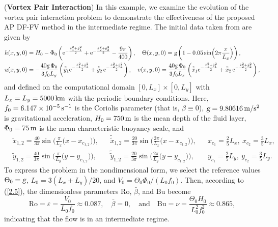 \documentclass[a4paper,11pt,twoside]{article}
\numberwithin{equation}{section}
\numberwithin{figure}{section}
\numberwithin{table}{section}
\newcommand{\eps}{\varepsilon}
\newcommand{\g}{\textsl{g}}
\newcommand{\Ro}{\mathrm{Ro}}
\newcommand{\Bu}{\mathrm{Bu}}
\newcommand\eref[1]{(\ref{#1})}
\begin{document}
\begin{example}({\bf Vortex Pair Interaction})
In this example, we examine the evolution of the vortex pair interaction problem to demonstrate the effectiveness of the proposed AP DF-FV
method in the intermediate regime. The initial data taken from \cite{Eldred_2019,Karasozen_2022,Tambyah_2025} are given by 
\begin{equation*}
\begin{aligned}
&h(x,y,0)=H_0-\Phi_0\left({\rm e}^{-\frac{\tilde x_1^2+\tilde y_1^2}{2}}+{\rm e}^{-\frac{\tilde x_2^2+\tilde y_2^2}{2}}-
\frac{9\pi}{400}\right),\quad\Theta(x,y,0)=\g\left(1-0.05\sin\!\Big(2\pi\frac{x}{L_x}\Big)\right),\\
&u(x,y,0)=-\frac{40\g\,\Phi_0}{3f_0L_y}\left(\tilde{\tilde{y}}_1{\rm e}^{-\frac{\tilde x_1^2+\tilde y_1^2}{2}}
+\tilde{\tilde{y}}_2\,{\rm e}^{-\frac{\tilde x_2^2+\tilde y_2^2}{2}}\right),\quad
v(x,y,0)=\frac{40\g\,\Phi_0}{3f_0L_x}\left(\tilde{\tilde{x}}_1{\rm e}^{-\frac{\tilde x_1^2+\tilde y_1^2}{2}}
+\tilde{\tilde{x}}_2\,{\rm e}^{-\frac{\tilde x_2^2+\tilde y_2^2}{2}}\right),
\end{aligned}
\end{equation*}
and defined on the computational domain $[0,L_x]\times[0,L_y]$ with $L_x=L_y=5000\,{\rm km}$ with the periodic boundary conditions. Here,
$f_0=6.147\times10^{-5}\,{\rm s^{-1}}$ is the Coriolis parameter (that is, $\beta\equiv0$), $\g=9.80616\,{\rm m/s^2}$ is gravitational
acceleration, $H_0=750\,{\rm m}$ is the mean depth of the fluid layer, $\Phi_0=75\,{\rm m}$ is the mean characteristic buoyancy scale, and 
\begin{equation*}
\begin{aligned}
&\tilde x_{1,2}=\frac{40}{3\pi}\sin\!\Big(\frac{\pi}{L_x}\big(x-x_{c_{1,2}}\big)\Big),&&
\tilde{\tilde x}_{1,2}=\frac{20}{3\pi}\sin\!\Big(\frac{2\pi}{L_x}\big(x-x_{c_{1,2}}\big)\Big),&&
x_{c_1}=\frac{2}{5}L_x,~x_{c_2}=\frac{3}{5}L_x,\\
&\tilde y_{1,2}=\frac{40}{3\pi}\sin\!\Big(\frac{\pi}{L_y}\big(y-y_{c_{1,2}}\big)\Big),&&
\tilde{\tilde y}_{1,2}=\frac{20}{3\pi}\sin\!\Big(\frac{2\pi}{L_y}\big(y-y_{c_{1,2}}\big)\Big),&&
y_{c_1}=\frac{2}{5}L_y,~y_{c_2}=\frac{3}{5}L_y.
\end{aligned}
\end{equation*}
To express the problem in the nondimensional form, we select the reference values $\Theta_0=\g$, $L_0=3(L_x+L_y)/20$, and $V_0=\Theta_0\Phi_0/(L_0f_0)$. Then, according to \eref{2.5}, the dimensionless parameters $\Ro$, 
$\bar\beta$, and $\Bu$ become
\begin{equation*}
\Ro=\eps=\frac{V_0}{L_0f_0}\approx0.087,\quad\bar\beta=0,\quad\mbox{and}\quad\Bu=\nu=\frac{\Theta_0H_0}{L_0^2f_0^2}\approx0.865,
\end{equation*}
indicating that the flow is in an intermediate regime.


\end{example}
\end{document}
